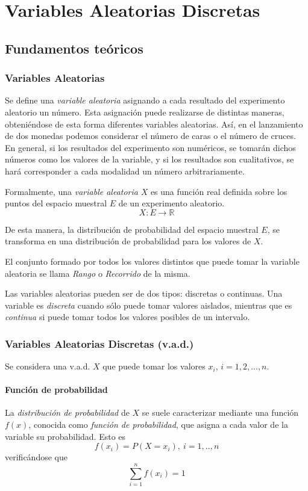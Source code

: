 
\chapter{Variables Aleatorias Discretas}

\section{Fundamentos teóricos}
\subsection{Variables Aleatorias}
Se define una \emph{variable aleatoria} asignando a cada resultado del experimento aleatorio un número. Esta asignación
puede realizarse de distintas maneras, obteniéndose de esta forma diferentes variables aleatorias.
Así, en el lanzamiento de dos monedas podemos considerar el número de caras o el número de cruces.
En general, si los resultados del experimento son numéricos, se tomarán dichos números como los valores de la variable,
y si los resultados son cualitativos, se hará corresponder a cada modalidad un número arbitrariamente.

Formalmente, una \emph{variable aleatoria} $X$ es una función real definida sobre los puntos del espacio muestral $E$ de
un experimento aleatorio. \[ X:E\rightarrow \mathbb{R}\]

De esta manera, la distribución de probabilidad del espacio muestral $E$, se transforma en una distribución de
probabilidad para los valores de $X$.

El conjunto formado por todos los valores distintos que puede tomar la variable aleatoria se llama \emph{Rango} o
\emph{Recorrido} de la misma.

Las variables aleatorias pueden ser de dos tipos: discretas o continuas. Una variable es \emph{discreta} cuando sólo
puede tomar valores aislados, mientras que es \emph{continua} si puede tomar todos los valores posibles de un intervalo.

\subsection{Variables Aleatorias Discretas (v.a.d.)}
Se considera una v.a.d. $X$ que puede tomar los valores $x_i$, $i=1,2,...,n$.

\subsubsection{Función de probabilidad}
La \emph{distribución de probabilidad} de $X$ se suele caracterizar mediante una función $f(x)$, conocida como
\emph{función de probabilidad}, que asigna a cada valor de la variable su probabilidad. 
Esto es 
\[
f(x_i)=P(X=x_i),\
i=1,..,n
\]
verificándose que 
\[
\sum_{i=1}^{n} f(x_i)=1
\]



